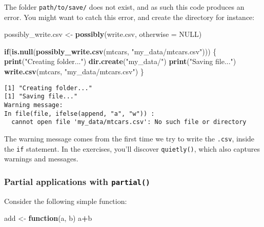 \documentclass[
]{article}
\newenvironment{Shaded}{\begin{snugshade}}{\end{snugshade}}
\newcommand{\ControlFlowTok}[1]{\textcolor[rgb]{0.13,0.29,0.53}{\textbf{#1}}}
\newcommand{\DataTypeTok}[1]{\textcolor[rgb]{0.13,0.29,0.53}{#1}}
\newcommand{\KeywordTok}[1]{\textcolor[rgb]{0.13,0.29,0.53}{\textbf{#1}}}
\newcommand{\NormalTok}[1]{#1}
\newcommand{\OperatorTok}[1]{\textcolor[rgb]{0.81,0.36,0.00}{\textbf{#1}}}
\newcommand{\OtherTok}[1]{\textcolor[rgb]{0.56,0.35,0.01}{#1}}
\newcommand{\StringTok}[1]{\textcolor[rgb]{0.31,0.60,0.02}{#1}}
\begin{document}
The folder \texttt{path/to/save/} does not exist, and as such this code produces an error. You might
want to catch this error, and create the directory for instance:

\begin{Shaded}
\begin{Highlighting}[]
\NormalTok{possibly\_write.csv \textless{}{-}}\StringTok{ }\KeywordTok{possibly}\NormalTok{(write.csv, }\DataTypeTok{otherwise =} \OtherTok{NULL}\NormalTok{)}

\ControlFlowTok{if}\NormalTok{(}\KeywordTok{is.null}\NormalTok{(}\KeywordTok{possibly\_write.csv}\NormalTok{(mtcars, }\StringTok{"my\_data/mtcars.csv"}\NormalTok{))) \{}
  \KeywordTok{print}\NormalTok{(}\StringTok{"Creating folder..."}\NormalTok{)}
  \KeywordTok{dir.create}\NormalTok{(}\StringTok{"my\_data/"}\NormalTok{)}
  \KeywordTok{print}\NormalTok{(}\StringTok{"Saving file..."}\NormalTok{)}
  \KeywordTok{write.csv}\NormalTok{(mtcars, }\StringTok{"my\_data/mtcars.csv"}\NormalTok{)}
\NormalTok{\}}
\end{Highlighting}
\end{Shaded}

\begin{verbatim}
[1] "Creating folder..."
[1] "Saving file..."
Warning message:
In file(file, ifelse(append, "a", "w")) :
  cannot open file 'my_data/mtcars.csv': No such file or directory
\end{verbatim}

The warning message comes from the first time we try to write the \texttt{.csv}, inside the \texttt{if}
statement. In the exercises, you'll discover \texttt{quietly()}, which also captures warnings and messages.

\hypertarget{partial-applications-with-partial}{%
\subsubsection{\texorpdfstring{Partial applications with \texttt{partial()}}{Partial applications with partial()}}\label{partial-applications-with-partial}}

Consider the following simple function:

\begin{Shaded}
\begin{Highlighting}[]
\NormalTok{add \textless{}{-}}\StringTok{ }\ControlFlowTok{function}\NormalTok{(a, b) a}\OperatorTok{+}\NormalTok{b}
\end{Highlighting}
\end{Shaded}
\end{document}
